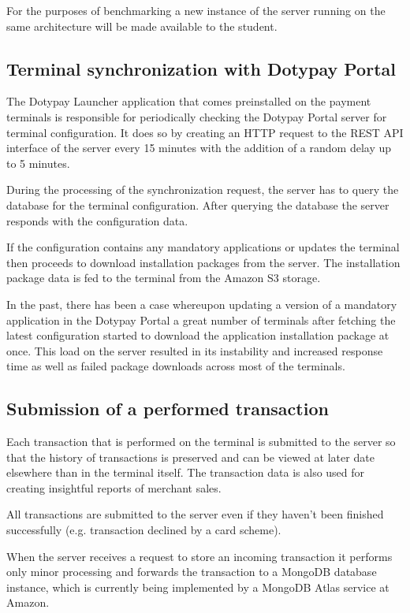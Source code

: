 \documentclass[12pt, a4paper]{article}
\begin{document}
For the purposes of benchmarking a new instance of the server running on the same architecture will be made available to the student.

\subsection{Terminal synchronization with Dotypay Portal}
The Dotypay Launcher application that comes preinstalled on the payment terminals is responsible for periodically checking the Dotypay Portal server for terminal configuration. It does so by creating an HTTP request to the REST API interface of the server every 15 minutes with the addition of a random delay up to 5 minutes.

During the processing of the synchronization request, the server has to query the database for the terminal configuration. After querying the database the server responds with the configuration data. 

If the configuration contains any mandatory applications or updates the terminal then proceeds to download installation packages from the server. The installation package data is fed to the terminal from the Amazon S3 storage.

In the past, there has been a case whereupon updating a version of a mandatory application in the Dotypay Portal a great number of terminals after fetching the latest configuration started to download the application installation package at once. 
This load on the server resulted in its instability and increased response time as well as failed package downloads across most of the terminals. 

\subsection{Submission of a performed transaction}
Each transaction that is performed on the terminal is submitted to the server so that the history of transactions is preserved and can be viewed at later date elsewhere than in the terminal itself.
The transaction data is also used for creating insightful reports of merchant sales.

All transactions are submitted to the server even if they haven't been finished successfully (e.g. transaction declined by a card scheme).

When the server receives a request to store an incoming transaction it performs only minor processing and forwards the transaction to a MongoDB database instance, which is currently being implemented by a MongoDB Atlas service at Amazon.
\end{document}
